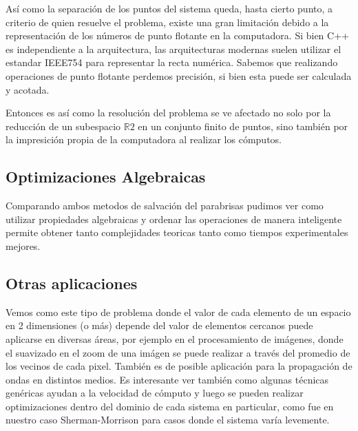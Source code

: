 As\'i como la separaci\'on de los puntos del sistema queda, hasta cierto punto, a criterio de quien resuelve el problema, existe una gran limitaci\'on debido	a la representaci\'on de los n\'umeros de punto flotante en la computadora. Si bien C++ es independiente a la arquitectura, las arquitecturas modernas suelen utilizar el estandar IEEE754 para representar la recta num\'erica. Sabemos que realizando operaciones de punto flotante perdemos precisi\'on, si bien esta puede ser calculada y acotada. 

Entonces es as\'i como la resoluci\'on del problema se ve afectado no solo por la reducci\'on de un subespacio $\mathbb{R}2$ en un conjunto finito de puntos, sino tambi\'en por la impresici\'on propia de la computadora al realizar los c\'omputos.

\subsection{Optimizaciones Algebraicas}

Comparando ambos metodos de salvación del parabrisas pudimos ver como utilizar propiedades algebraicas y ordenar las operaciones de manera inteligente permite obtener tanto complejidades teoricas tanto como tiempos experimentales mejores.

\subsection{Otras aplicaciones}

Vemos como este tipo de problema donde el valor de cada elemento de un espacio en 2 dimensiones (o m\'as) depende del valor de elementos cercanos puede aplicarse en diversas \'areas, por ejemplo en el procesamiento de im\'agenes, donde el suavizado en el zoom de una im\'agen se puede realizar a trav\'es del promedio de los vecinos de cada pixel. Tambi\'en es de posible aplicaci\'on para la propagaci\'on de ondas en distintos medios. Es interesante ver tambi\'en como algunas t\'ecnicas gen\'ericas ayudan a la velocidad de c\'omputo y luego se pueden realizar optimizaciones dentro del dominio de cada sistema en particular, como fue en nuestro caso Sherman-Morrison para casos donde el sistema var\'ia levemente.
